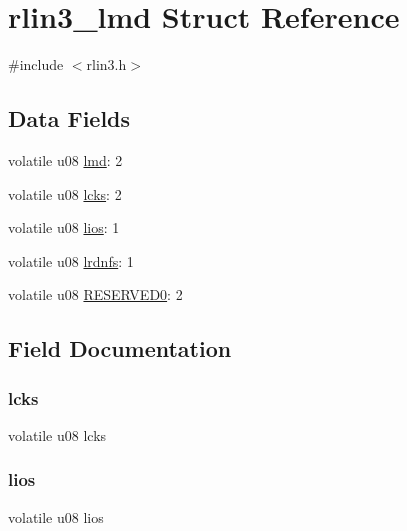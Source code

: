 \hypertarget{structrlin3__lmd}{}\section{rlin3\+\_\+lmd Struct Reference}
\label{structrlin3__lmd}


{\ttfamily \#include $<$rlin3.\+h$>$}

\subsection*{Data Fields}
\begin{DoxyCompactItemize}
\item 
volatile u08 \mbox{\hyperlink{structrlin3__lmd_a758e51afbea8c42173bad9d951e124bb}{lmd}}\+: 2
\item 
volatile u08 \mbox{\hyperlink{structrlin3__lmd_aa9ed20fcf210a3132dc6f95f0fdabc7b}{lcks}}\+: 2
\item 
volatile u08 \mbox{\hyperlink{structrlin3__lmd_a6f257043f15702fab81eb6bcadb0dc7f}{lios}}\+: 1
\item 
volatile u08 \mbox{\hyperlink{structrlin3__lmd_a60ae11c6a09d11af809041fe18f941fd}{lrdnfs}}\+: 1
\item 
volatile u08 \mbox{\hyperlink{structrlin3__lmd_a59c0b30ccfb89f1b34e9682741859abd}{R\+E\+S\+E\+R\+V\+E\+D0}}\+: 2
\end{DoxyCompactItemize}


\subsection{Field Documentation}
\mbox{\label{structrlin3__lmd_aa9ed20fcf210a3132dc6f95f0fdabc7b}} 
\subsubsection{\texorpdfstring{lcks}{lcks}}
{\footnotesize\ttfamily volatile u08 lcks}

\mbox{\label{structrlin3__lmd_a6f257043f15702fab81eb6bcadb0dc7f}} 
\subsubsection{\texorpdfstring{lios}{lios}}
{\footnotesize\ttfamily volatile u08 lios}

